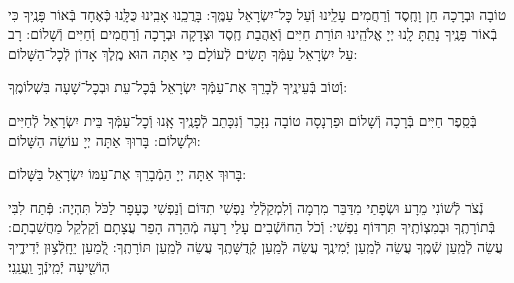 \documentclass[twoside, openany, parskip=half, 11pt]{book}
\begin{document}
\clearpage


\clearpage

\begin{paracol}{2}
\\
טוֹבָה וּבְרָכָה חֵן וָחֶֽסֶד וְֿרַחֲמִים עָלֵֽינוּ וְֿעַל כׇּל־יִשְׂרָאֵל עַמֶּֽךָ: בָּרֲכֵֽנוּ אָבִֽינוּ כֻּלָּֽנוּ כְּֿאֶחָד בְּֿאוֹר פָּנֶֽיךָ כִּי בְֿאוֹר פָּנֶֽיךָ נָתַֽתָּ לָֽנוּ יְיָ אֱלֹהֵֽינוּ תּוֹרַת חַיִּים וְֿאַהֲבַת חֶֽסֶד וּצְדָקָה וּבְרָכָה וְֿרַחֲמִים וְֿחַיִּים וְֿשָׁלוֹם:
\switchcolumn
{}
רָב עַל יִשְׂרָאֵל עַמְּֿךָ תָּשִׂים לְֿעוֹלָם כִּי אַתָּה הוּא מֶֽלֶךְ אָדוֹן לְֿכׇל־הַשָּׁלוֹם:
\end{paracol}
וְֿטוֹב בְּֿעֵינֶֽיךָ לְֿבָרֵךְ אֶת־עַמְּֿךָ יִשְׂרָאֵל בְּֿכׇל־עֵת וּבְכׇל־שָׁעָה בִּשְׁלוֹמֶֽךָ:


\begin{paracol}{2}
\begin{small}
בְּֿסֵֽפֶר חַיִּים בְּֿרָכָה וְֿשָׁלוֹם וּפַרְנָסָה טוֹבָה נִזָּכֵר וְֿנִכָּתֵב לְֿפָנֶֽיךָ אָֽנוּ וְֿכׇל־עַמְּֿךָ בֵּית יִשְׂרָאֵל לְֿחַיִּים וּלְשָׁלוֹם: בָּרוּךְ אַתָּה יְיָ עוֹשֵׂה הַשָּׁלוֹם:

\end{small}
\switchcolumn
בָּרוּךְ אַתָּה יְיָ הַמְֿבָרֵךְ אֶת־עַמּוֹ יִשְׂרָאֵל בַּשָּׁלוֹם:

\end{paracol}

נְֿצֹר לְֿשׁוֹנִי מֵרָע וּשְׂפָתַי מִדַּבֵּר מִרְמָה וְֿלִמְקַלְֿלַי נַפְשִׁי תִדּוֹם וְֿנַפְשִׁי כֶּעָפָר לַכֹּל תִּהְיֶה: פְּֿתַח לִבִּי בְּֿתוֹרָתֶֽךָ וּבְמִצְוֹתֶֽיךָ תִּרְדּוֹף נַפְשִׁי: וְֿכֹל הַחוֹשְֿׁבִים עָלַי רָעָה מְֿהֵרָה הָפֵר עֲצָתָם וְֿקַלְקֵל מַחֲשַׁבְתָם: עֲשֵׂה לְֿמַֽעַן שְֿׁמֶֽךָ עֲשֵׂה לְֿמַֽעַן יְֿמִינֶֽךָ עֲשֵׂה לְֿמַֽעַן קְֿדֻשָּׁתֶֽךָ עֲשֵׂה לְֿמַֽעַן תּוֹרָתֶֽךָ: לְֿ֭מַעַן יֵחָֽלְֿצ֥וּן יְֿדִידֶ֑יךָ הֽוֹשִׁ֖יעָה יְֿמִֽינְֿךָ֣ וַֽעֲנֵֽנִי׃
\end{document}
